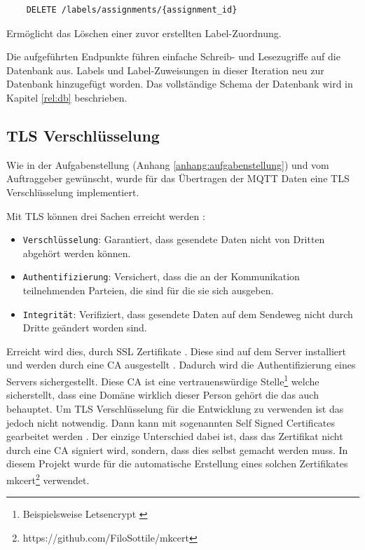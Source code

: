 \begin{verbatim}
    DELETE /labels/assignments/{assignment_id}
\end{verbatim}
Ermöglicht das Löschen einer zuvor erstellten Label-Zuordnung.

Die aufgeführten Endpunkte führen einfache Schreib- und Lesezugriffe auf die Datenbank aus.
Labels und Label-Zuweisungen in dieser Iteration neu zur Datenbank hinzugefügt worden.
Das vollständige Schema der Datenbank wird in Kapitel \ref{rel:db} beschrieben.


\subsection{\ac{TLS} Verschlüsselung}

Wie in der Aufgabenstellung (Anhang \ref{anhang:aufgabenstellung}) und vom Auftraggeber gewünscht, wurde
für das Übertragen der \ac{MQTT} Daten eine \ac{TLS} Verschlüsselung implementiert.

Mit \ac{TLS} können drei Sachen erreicht werden \parencite{what_is_tls}:

\begin{itemize}
    \item \texttt{Verschlüsselung}: Garantiert, dass gesendete Daten nicht von Dritten abgehört werden können.
    \item \texttt{Authentifizierung}: Versichert, dass die an der Kommunikation teilnehmenden Parteien, die sind für die sie sich ausgeben.
    \item \texttt{Integrität}: Verifiziert, dass gesendete Daten auf dem Sendeweg nicht durch Dritte geändert worden sind.
\end{itemize}

Erreicht wird dies, durch SSL Zertifikate \parencite{what_is_ssl_certificate}. Diese sind auf dem Server
installiert und werden durch eine \ac{CA} ausgestellt \parencite{what_is_ca}.
Dadurch wird die Authentifizierung eines Servers sichergestellt.
Diese \ac{CA} ist eine vertrauenswürdige Stelle\footnote{
    Beispielsweise Letsencrypt \parencite{letsencrypt_2021}
} welche sicherstellt, dass eine Domäne wirklich dieser Person gehört die das auch behauptet.
Um \ac{TLS} Verschlüsselung für die Entwicklung zu verwenden ist das jedoch nicht notwendig.
Dann kann mit sogenannten Self Signed Certificates gearbeitet werden \parencite{self_signed_cert}.
Der einzige Unterschied dabei ist, dass das Zertifikat nicht durch eine \ac{CA} signiert wird, sondern, dass
dies selbst gemacht werden muss. In diesem Projekt wurde für die automatische Erstellung eines solchen
Zertifikates mkcert\footnote{https://github.com/FiloSottile/mkcert} verwendet.

